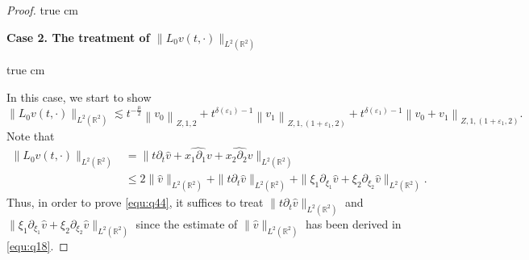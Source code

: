 \documentclass[11pt,twoside]{article}
\newcommand{\R}{\mathbb R}
\newcommand{\p}{\partial}
\newcommand{\f}{\frac}
\theoremstyle{plain}
\theoremstyle{definition}
\theoremstyle{remark}
\numberwithin{equation}{section}
\begin{document}
\begin{proof}
 true cm

{\bf Case 2.  The treatment  of $\|L_0v(t, \cdot)\|_{L^2(\R^2)}$ }

 true cm

In this case, we start to show
\begin{equation}\label{equ:q44}
\|L_0v(t, \cdot)\|_{L^2(\R^2)} \lesssim t^{-\f{\mu}{2}}\left\|v_0\right\|_{Z, 1, 2}
+t^{\delta(\varepsilon_1)-1}\left\|v_1\right\|_{Z, 1,(1+\varepsilon_1, 2)}
+t^{\delta(\varepsilon_1)-1}\left\|v_0+v_1\right\|_{Z, 1,(1+\varepsilon_1, 2)}.
\end{equation}
Note that
\begin{equation}\label{equ:q45}
\begin{aligned}
\|L_0v(t, \cdot)\|_{L^2(\R^2)}& =\|t\p_t\hat{v}+\widehat{x_1\p_1v}+\widehat{x_2\p_2v}\|_{L^2(\R^2)}\\
&\leq 2\|\hat{v}\|_{L^2(\R^2)}+\|t\p_t\hat{v}\|_{L^2(\R^2)}+\|\xi_1\p_{\xi_1}\hat{v}+\xi_2\p_{\xi_2}\hat{v}\|_{L^2(\R^2)}.
\end{aligned}
\end{equation}
Thus, in order to prove \eqref{equ:q44}, it suffices to treat $\|t\p_t\hat{v}\|_{L^2(\R^2)}$ and $\|\xi_1\p_{\xi_1}\hat{v}+\xi_2\p_{\xi_2}\hat{v}\|_{L^2(\R^2)}$ since the estimate of $\|\hat{v}\|_{L^2(\R^2)}$ has been derived in \eqref{equ:q18}.


\end{proof}
\end{document}

